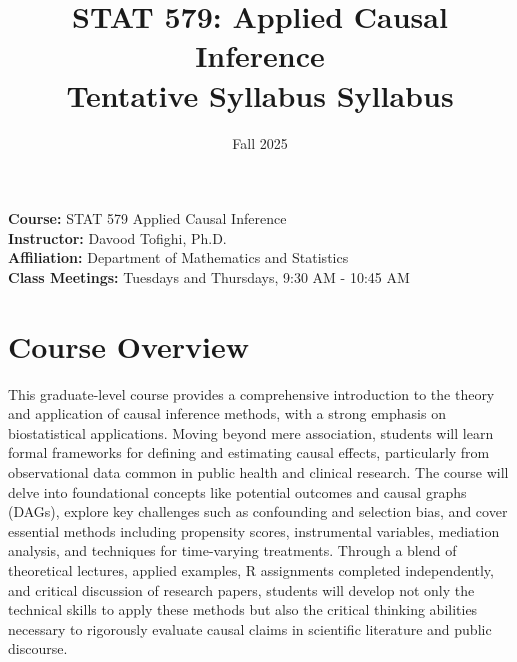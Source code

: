\documentclass[10.5pt]{article}
\title{STAT 579: Applied Causal Inference \\ \large Tentative Syllabus Syllabus }
\date{Fall 2025}
\begin{document}
\maketitle
\vspace{3em}

\begin{flushleft}
\textbf{Course:} STAT 579 Applied Causal Inference \\
\textbf{Instructor:} Davood Tofighi, Ph.D. \\
\textbf{Affiliation:} Department of Mathematics and Statistics \\
\textbf{Class Meetings:} Tuesdays and Thursdays, 9:30 AM - 10:45 AM\end{flushleft}


\section{Course Overview}

This graduate-level course provides a comprehensive introduction to the theory and application of causal inference methods, with a strong emphasis on biostatistical applications. Moving beyond mere association, students will learn formal frameworks for defining and estimating causal effects, particularly from observational data common in public health and clinical research. The course will delve into foundational concepts like potential outcomes and causal graphs (DAGs), explore key challenges such as confounding and selection bias, and cover essential methods including propensity scores, instrumental variables, mediation analysis, and techniques for time-varying treatments. Through a blend of theoretical lectures, applied examples, R assignments completed independently, and critical discussion of research papers, students will develop not only the technical skills to apply these methods but also the critical thinking abilities necessary to rigorously evaluate causal claims in scientific literature and public discourse.
\end{document}
